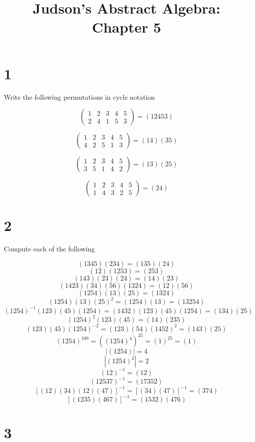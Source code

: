 \documentclass[a4paper]{article}
\title{Judson's Abstract Algebra: Chapter 5}
\date{}
\begin{document}
\maketitle

\section*{1}

Write the following permutations in cycle notation

$$
\begin{pmatrix}
1 & 2 & 3 & 4 & 5 \\
2 & 4 & 1 & 5 & 3
\end{pmatrix}
= (12453)$$

$$
\begin{pmatrix}
1 & 2 & 3 & 4 & 5 \\
4 & 2 & 5 & 1 & 3
\end{pmatrix}
= (14)(35)$$

$$
\begin{pmatrix}
1 & 2 & 3 & 4 & 5 \\
3 & 5 & 1 & 4 & 2
\end{pmatrix}
= (13)(25)$$

$$
\begin{pmatrix}
1 & 2 & 3 & 4 & 5 \\
1 & 4 & 3 & 2 & 5
\end{pmatrix}
= (24)$$


\section*{2}

Compute each of the following

$$(1345)(234) = (135)(24)$$
$$(12)(1253) = (253)$$
$$(143)(23)(24) = (14)(23)$$
$$(1423)(34)(56)(1324) = (12)(56)$$
$$(1254)(13)(25) = (1324)$$
$$(1254)(13)(25)^2 = (1254)(13) = (13254)$$
$$(1254)^{-1}(123)(45)(1254) = (1432)(123)(45)(1254) = (134)(25)$$
$$(1254)^2(123)(45) = (14)(235)$$
$$(123)(45)(1254)^{-2} = (123)(54)(1452)^2 = (143)(25)$$
$$(1254)^{100} = ((1254)^4)^{25} = (1)^{25} = (1)$$
$$|(1254)| = 4$$
$$|(1254)^2| = 2$$
$$(12)^{-1} = (12)$$
$$(12537)^{-1} = (17352)$$
$$[(12)(34)(12)(47)]^{-1} = [(34)(47)]^{-1} = (374)$$
$$[(1235)(467)]^{-1} = (1532)(476)$$


\section*{3}
\end{document}
